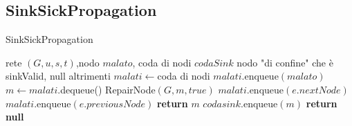 \documentclass{article}
\begin{document}
\subsection{SinkSickPropagation}
\begin{algorithm}
    \caption {SinkSickPropagation}
    \begin{algorithmic}
        \REQUIRE rete $(G,u,s,t)$,nodo $malato$, coda di nodi $codaSink$
        \ENSURE nodo "di confine" che è sinkValid, null altrimenti
        \STATE $malati \leftarrow $coda di nodi
        \STATE $malati.$enqueue$(malato)$
            \STATE $m \leftarrow malati.$dequeue()
                \STATE RepairNode$(G,m,true)$
                        \STATE $malati.$enqueue$(e.nextNode)$
                    \ENDFOR
                        \STATE $malati.$enqueue$(e.previousNode)$
                    \ENDFOR
                 
                    \STATE \textbf{return} $m$
                \ELSE
                    \STATE $codasink.$enqueue$(m)$
                \ENDIF
            \ENDIF
        \ENDWHILE
        \STATE \textbf{return null}
    \end{algorithmic}
\end{algorithm}
\end{document}
